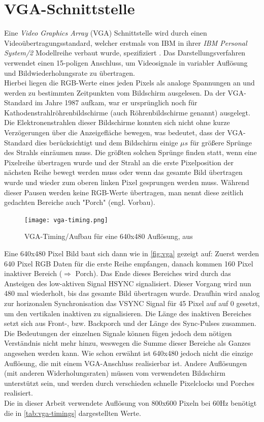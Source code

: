 \documentclass[a4paper,12pt,onesided]{report}
\begin{document}
\section{VGA-Schnittstelle}
\label{chap:vga}
Eine \textit{Video Graphics Array} (VGA) Schnittstelle wird durch einen Videoübertragungsstandard, welcher erstmals von IBM in ihrer \textit{IBM Personal System/2} Modellreihe verbaut wurde, spezifiziert \cite{ibmTimeline}. 
Das Darstellungsverfahren verwendet einen 15-poligen Anschluss, um Videosignale in variabler Auflösung und Bildwiederholungsrate zu übertragen.\\
Hierbei liegen die RGB-Werte eines jeden Pixels als analoge Spannungen an und werden zu bestimmten Zeitpunkten vom Bildschirm ausgelesen. 
Da der VGA-Standard im Jahre 1987 aufkam, war er ursprünglich noch für  Kathodenstrahlröhrenbildschirme (auch Röhrenbildschirme genannt) ausgelegt. 
Die Elektronenstrahlen dieser Bildschirme konnten sich nicht ohne kurze Verzögerungen über die Anzeigefläche bewegen, was bedeutet, dass der VGA-Standard dies berücksichtigt und dem Bildschirm einige $\mu s$ für größere Sprünge des Strahls einräumen muss.
Die größten solchen Sprünge finden statt, wenn eine Pixelreihe übertragen wurde und der Strahl an die erste Pixelposition der nächsten Reihe bewegt werden muss oder wenn das gesamte Bild übertragen wurde und wieder zum oberen linken Pixel gesprungen werden muss.
Während dieser Pausen werden keine RGB-Werte übertragen, man nennt diese zeitlich gedachten Bereiche auch "Porch" (engl. Vorbau).\\

\begin{figure}[H]
	\centering
	\texttt{[image: vga-timing.png]}
	\caption{VGA-Timing/Aufbau für eine 640x480 Auflösung, aus \cite{vga-timing}}
	\label{fig:vga}
\end{figure}

Eine 640x480 Pixel Bild baut sich dann wie in \autoref{fig:vga} gezeigt auf:
Zuerst werden 640 Pixel RGB Daten für die erste Reihe empfangen, danach kommen 160 Pixel inaktiver Bereich ($\Rightarrow$ Porch). Das Ende dieses Bereiches wird durch das Ansteigen des low-aktiven Signal HSYNC signalisiert. Dieser Vorgang wird nun 480 mal wiederholt, bis das gesamte Bild übertragen wurde. Draufhin wird analog zur horizonalen Synchronisation das VSYNC Signal für 45 Pixel auf auf 0 gesetzt, um den vertikalen inaktiven zu signalisieren. Die Länge des inaktiven Bereiches setzt sich aus Front-, bzw. Backporch und der Länge des Sync-Pulses zusammen. Die Bedeutungen der einzelnen Signale können fügen jedoch dem nötigen Verständnis nicht mehr hinzu, weswegen die Summe dieser Bereiche als Ganzes angesehen werden kann.
Wie schon erwähnt ist 640x480 jedoch nicht die einzige Auflösung, die mit einem VGA-Anschluss realisierbar ist. Andere Auflösungen (mit anderen Widerholungsraten) müssen vom verwendeten Bildschirm unterstützt sein, und werden durch verschieden schnelle Pixelclocks und Porches realisiert.\\
Die in dieser Arbeit verwendete Auflösung von 800x600 Pixeln bei 60Hz benötigt die in \autoref{tab:vga-timings} dargestellten Werte.
\end{document}
